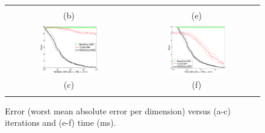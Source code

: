 \documentclass{article} %
\begin{document}
\begin{figure}[t!]
\begin{center}
\begin{tabular}{cc}
\vspace{-1.5mm}
\\
   \hspace{-5mm} \footnotesize(b) 
& \hspace{-4mm} \footnotesize(e) 
\\
\hspace{-5mm} \includegraphics[width=0.49\textwidth,height=0.37\textwidth]{plots1/expectationVsamples_dim50.pdf} 
& \hspace{-3mm} \includegraphics[width=0.49\textwidth,height=0.37\textwidth]{plots1/expectationVtime_dim50.pdf} 
\vspace{-1.5mm}
\\
\hspace{-5mm} \footnotesize(c) 
& \hspace{-4mm} \footnotesize(f) 
\\
\multicolumn{2}{c}{}
\end{tabular}
\end{center}
\vspace{-8mm}
\caption{\footnotesize
Error (worst mean absolute error per dimension) versus (a-c) iterations and (e-f) time (ms). 
} 
\end{figure}
\end{document}
